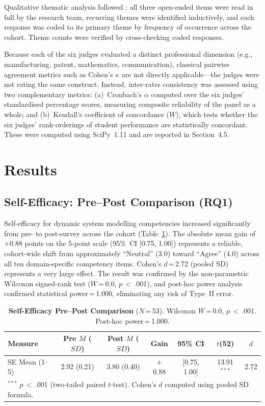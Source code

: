 \documentclass[utf8]{FrontiersinHarvard}
\begin{document}
Qualitative thematic analysis followed \citet{thomas2008methods}: all three
open-ended items were read in full by the research team, recurring themes were
identified inductively, and each response was coded to its primary theme by
frequency of occurrence across the cohort. Theme counts were verified by
cross-checking coded responses.

Because each of the six judges evaluated a distinct professional dimension
(e.g., manufacturing, patent, mathematics, communication), classical pairwise
agreement metrics such as Cohen's $\kappa$ are not directly applicable---the
judges were not rating the same construct. Instead, inter-rater consistency
was assessed using two complementary metrics: (a)~Cronbach's $\alpha$
computed over the six judges' standardised percentage scores, measuring
composite reliability of the panel as a whole; and (b)~Kendall's coefficient
of concordance ($W$), which tests whether the six judges' rank-orderings of
student performance are statistically concordant. These were computed using
SciPy~1.11 and are reported in Section~4.5.

\section{Results}

\subsection{Self-Efficacy: Pre--Post Comparison (RQ1)}

Self-efficacy for dynamic system modelling competencies increased
significantly from pre- to post-survey across the cohort
(Table~\ref{tab:se_main}). The absolute mean gain of $+$0.88 points on
the 5-point scale (95\%~CI [0.75, 1.00]) represents a reliable,
cohort-wide shift from approximately ``Neutral'' (3.0) toward ``Agree''
(4.0) across all ten domain-specific competency items. Cohen's $d$\,=\,2.72
(pooled SD) represents a very large effect. The result was confirmed by the
non-parametric Wilcoxon signed-rank test ($W$\,=\,0.0, $p$\,$<$\,.001),
and post-hoc power analysis confirmed statistical power\,=\,1.000,
eliminating any risk of Type~II error.

\begin{table}[h]
\caption{\textbf{Self-Efficacy Pre--Post Comparison} ($N$\,=\,53).
Wilcoxon $W$\,=\,0.0, $p$\,$<$\,.001. Post-hoc power\,=\,1.000.}
\label{tab:se_main}
\begin{tabular}{lcccccc}
\toprule
\textbf{Measure} & \textbf{Pre} $M$ ($SD$) & \textbf{Post} $M$ ($SD$) &
\textbf{Gain} & \textbf{95\% CI} & $t$(52) & $d$ \\
\midrule
SE Mean (1--5) & 2.92 (0.21) & 3.80 (0.40) & $+$0.88 &
[0.75, 1.00] & 13.91$^{***}$ & 2.72 \\
\bottomrule
\multicolumn{7}{l}{\small $^{***}$ $p$\,$<$\,.001 (two-tailed paired $t$-test).
Cohen's $d$ computed using pooled SD formula.} \\
\end{tabular}
\end{table}
\end{document}
